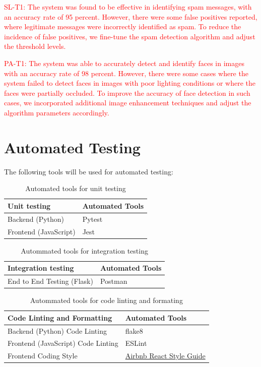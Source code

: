 \documentclass[12pt, titlepage]{article}
\begin{document}
\textcolor{red}{SL-T1: The system was found to be effective in identifying spam messages, with an accuracy rate of 95 percent.
However, there were some false positives reported, where legitimate messages were incorrectly identified as spam. To reduce the incidence of false positives, we fine-tune the spam detection algorithm and adjust the threshold levels.}

\textcolor{red}{PA-T1: The system was able to accurately detect and identify faces in images with an accuracy rate of 98 percent. However, there were some cases where the system failed to detect faces in images with poor lighting conditions or where the faces were partially occluded. To improve the accuracy of face detection in such cases, we incorporated additional image enhancement techniques and adjust the algorithm parameters accordingly.}



\section{Automated Testing}
The following tools will be used for automated testing:

\begin{table}[ht!]
    \centering
    \begin{tabular}{p{}|p{}}
    \hline
        \textbf{Unit testing} & \textbf{Automated Tools} \\ \hline
        Backend (Python) & Pytest \\ \hline
        Frontend (JavaScript) & Jest \\ \hline
    \end{tabular}
    \caption{Automated tools for unit testing}
\end{table}

\begin{table}[!h]
    \centering
    \begin{tabular}{p{}|p{}}
    \hline
        \textbf{Integration testing} & \textbf{Automated Tools} \\ \hline
        End to End Testing (Flask) & Postman \\ \hline
    \end{tabular}
    \caption{Autommated tools for integration testing}
\end{table}

\begin{table}[!h]
    \centering
    \begin{tabular}{p{}|p{}}
    \hline
        \textbf{Code Linting and Formatting} & \textbf{Automated Tools} \\ \hline
        Backend (Python) Code Linting & flake8 \\ \hline
        Frontend (JavaScript) Code Linting & ESLint \\ \hline
        Frontend Coding Style & \href{https://airbnb.io/javascript/react/}{Airbnb React Style Guide} \\ \hline
    \end{tabular}
    \caption{Autommated tools for code linting and formating}
\end{table}
\end{document}
